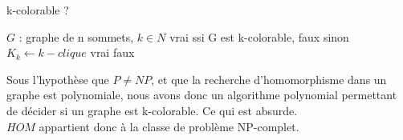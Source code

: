 \begin{center}
\begin{algorithm}[H]
\caption{k-colorable ?}\label{ex21_algo}
\begin{algorithmic}[1]
\REQUIRE $G$ : graphe de n sommets,
		 $k \in N$
\ENSURE vrai ssi G est k-colorable, faux sinon
	\STATE $K_k \leftarrow k-clique$
		\RETURN vrai
	\ELSE
		\RETURN faux
	\ENDIF
\end{algorithmic}
\end{algorithm}
\end{center}

Sous l'hypoth\`ese que $P \neq NP$, et que la recherche d'homomorphisme dans un graphe
est polynomiale, nous avons donc un algorithme polynomial permettant de d\'ecider si un
graphe est k-colorable.
Ce qui est absurde.\\
$HOM$ appartient donc \`a la classe de probl\`eme NP-complet.

